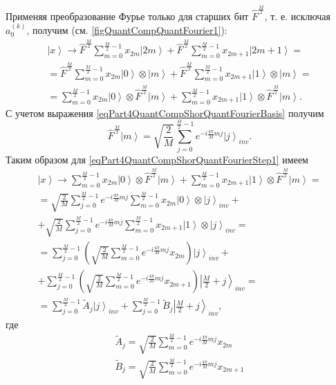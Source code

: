 Применяя преобразование Фурье только для старших бит $\hat{F}^{\frac{M}{2}}$,
т. е. исключая $a^{(k)}_0$, получим (см. \autoref{figQuantCompQuantFourier1}):
\begin{eqnarray}
\left|x\right> \rightarrow
\hat{F}^{\frac{M}{2}} \sum_{m = 0}^{\frac{M}{2} - 1}x_{2m} \left|2m\right> +
\hat{F}^{\frac{M}{2}} \sum_{m = 0}^{\frac{M}{2} - 1}x_{2m + 1}
\left|2m+1\right> = 
\nonumber \\
=
\hat{F}^{\frac{M}{2}} \sum_{m = 0}^{\frac{M}{2} - 1}x_{2m} 
\left|0\right> \otimes  \left|m\right> +
\hat{F}^{\frac{M}{2}} \sum_{m = 0}^{\frac{M}{2} - 1}x_{2m + 1}
\left|1\right> \otimes  \left|m\right>
=
\nonumber \\
=
\sum_{m = 0}^{\frac{M}{2} - 1}x_{2m} 
\left|0\right> \otimes \hat{F}^{\frac{M}{2}} \left|m\right> +
\sum_{m = 0}^{\frac{M}{2} - 1}x_{2m + 1}
\left|1\right> \otimes \hat{F}^{\frac{M}{2}} \left|m\right>.
\label{eqPart4QuantCompShorQuantFourierStep1}
\end{eqnarray}
С учетом выражения \eqref{eqPart4QuantCompShorQuantFourierBasis} получим
\begin{equation}
\hat{F}^{\frac{M}{2}} \left|m\right> = \sqrt{\frac{2}{M}}
\sum_{j= 0}^{\frac{M}{2} - 1} e^{-i \frac{4 \pi}{M} m j}\left|j\right>_{inv}.
\nonumber
\end{equation}
Таким образом для \eqref{eqPart4QuantCompShorQuantFourierStep1} имеем
\begin{eqnarray}
\left|x\right> \rightarrow
\sum_{m = 0}^{\frac{M}{2} - 1}x_{2m} 
\left|0\right> \otimes \hat{F}^{\frac{M}{2}} \left|m\right> +
\sum_{m = 0}^{\frac{M}{2} - 1}x_{2m + 1}
\left|1\right> \otimes \hat{F}^{\frac{M}{2}} \left|m\right> = 
\nonumber \\
=
\sqrt{\frac{2}{M}} \sum_{j = 0}^{\frac{M}{2} - 1} e^{-i \frac{4 \pi}{M} m j} 
\sum_{m = 0}^{\frac{M}{2} - 1}x_{2m} \left|0\right> \otimes
\left|j\right>_{inv}
+
\nonumber \\
+
\sqrt{\frac{2}{M}} \sum_{j = 0}^{\frac{M}{2} - 1} e^{-i \frac{4 \pi}{M} m j} 
\sum_{m = 0}^{\frac{M}{2} - 1}x_{2m+1} \left|1\right> \otimes
\left|j\right>_{inv}
=
\nonumber \\
=
\sum_{j = 0}^{\frac{M}{2} - 1}  
\left( \sqrt{\frac{2}{M}} 
\sum_{m = 0}^{\frac{M}{2} - 1} e^{-i \frac{4 \pi}{M} m j} x_{2m} 
\right) \left|j\right>_{inv}
+
\nonumber \\
+
\sum_{j = 0}^{\frac{M}{2} - 1}
\left( \sqrt{\frac{2}{M}}  
\sum_{m = 0}^{\frac{M}{2} - 1}e^{-i \frac{4 \pi}{M} m j} x_{2m+1} 
\right)
\left|\frac{M}{2} + j\right>_{inv}
=
\nonumber \\
= \sum^{\frac{M}{2} - 1}_{j = 0}  \tilde{A}_{j} \left|j\right>_{inv} +
\sum^{\frac{M}{2} - 1}_{j = 0}  \tilde{B}_{j} \left|\frac{M}{2} + j\right>_{inv},
\nonumber
\end{eqnarray}
где
\begin{eqnarray}
\tilde{A}_{j} = 
\sqrt{\frac{2}{M}} 
\sum_{m = 0}^{\frac{M}{2} - 1} e^{-i \frac{4 \pi}{M} m j} x_{2m} 
\nonumber \\
\tilde{B}_{j} =
\sqrt{\frac{2}{M}} 
\sum_{m = 0}^{\frac{M}{2} - 1} e^{-i \frac{4 \pi}{M} m j} x_{2m+1} 
\label{eqPart4QuantCompShorAB}
\end{eqnarray}

